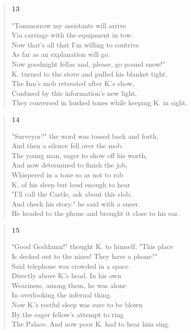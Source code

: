 \documentclass{article}
\begin{document}
\begin{verse}
  \begin{center}
    \textbf{13} \\
  \end{center}
  "Tommorrow my assistants will arrive \\
  Via carriage with the equipment in tow. \\
  Now that's all that I'm willing to contrive \\
  As far as an explanation will go. \\
  Now goodnight fellas and, please, go pound snow!" \\
  K. turned to the stove and pulled his blanket tight. \\
  The Inn's mob retreated after K.'s show, \\
  Confused by this information's new light, \\
  They conversed in hushed tones while keeping K. in sight.
\end{verse}
\begin{verse}
  \begin{center}
    \textbf{14} \\
  \end{center}
  "Surveyor?" the word was tossed back and forth, \\
  And then a silence fell over the mob. \\
  The young man, eager to show off his worth, \\
  And now determined to finish the job, \\
  Whispered in a tone so as not to rob \\
  K. of his sleep but loud enough to hear \\
  "I'll call the Castle, ask about this slob, \\
  And check his story." he said with a sneer. \\
  He headed to the phone and brought it close to his ear.
\end{verse}
\begin{verse}
  \begin{center}
    \textbf{15} \\
  \end{center}
  "Good Goddamn!" thought K. to himself, "This place \\
  Is decked out to the nines! They have a phone?" \\
  Said telephone was crowded in a space \\
  Directly above K.'s head. In his own \\
  Weariness, among them, he was alone \\
  In overlooking the infernal thing. \\
  Now K.'s restful sleep was sure to be blown \\
  By the eager fellow's attempt to ring \\
  The Palace. And now poor K. had to hear him sing.
\end{verse}
\end{document}
